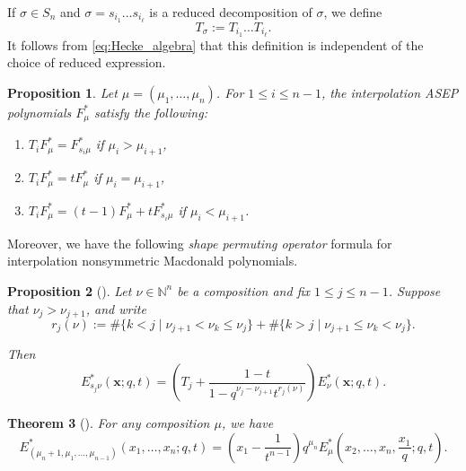 \documentclass[12pt]{amsart}
\newtheorem{thm}{Theorem}[section]
\newtheorem{prop}[thm]{Proposition}
\theoremstyle{definition}
\newcommand{\bfx}{\boldsymbol{x}}
\newcommand{\NN}{\mathbb N}
\def\LW#1{(\textcolor{teal}{LW:#1})}
\def\HBD#1{(\textcolor{violet}{HBD:#1})}
\begin{document}
\begin{appendices}
If $\sigma\in S_n$ and $\sigma=s_{i_1}\dots s_{i_\ell}$ is a reduced decomposition of $\sigma$, we define 
\begin{equation}\label{def:Hecke}
T_\sigma:=T_{i_1}\dots T_{i_\ell}.
\end{equation}
It follows from \eqref{eq:Hecke_algebra} that this definition is independent of the choice of reduced expression. 


\begin{prop}\label{prop:T_i-F_star} \cite[Proposition 2.10]{BenDaliWilliams2025}
    Let $\mu = (\mu_1,\dots,\mu_n)$.  For $1\leq i \leq n-1$, the interpolation ASEP polynomials $F^*_\mu$ satisfy the following: %
    \begin{enumerate}
        \item\label{item 1} $T_i F^*_{\mu}=F^*_{s_i\mu}$ if $\mu_i>\mu_{i+1}$,
        \item\label{item 2} $T_iF^*_{\mu}=tF^*_{\mu}$ if $\mu_i=\mu_{i+1}$,
        \item\label{item 3} $T_i F^*_{\mu}=(t-1)F^*_{\mu}+tF^*_{s_i\mu}$ if $\mu_i<\mu_{i+1}$.
    \end{enumerate}
\end{prop}

Moreover, we have the following \emph{shape permuting
operator} formula for interpolation nonsymmetric Macdonald polynomials.

\begin{prop}[{\cite[Proposition 3.6]{BenDaliWilliams2025}}]
\label{prop:shape}
Let $\nu\in \NN^n$ be a composition and fix $1\leq j \leq n-1$. Suppose that $\nu_j>\nu_{j+1}$, and
write
\begin{equation}\label{eq:def_r}
r_j(\nu):=
\#\{k<j \mid \nu_{j+1}<\nu_{k}\leq \nu_j\}
+
\#\{k>j \mid \nu_{j+1}\leq \nu_k < \nu_j\}.
\end{equation}

Then
    \begin{equation}
\label{shape-permute}
E^*_{s_j \nu}(\bfx;q,t) = 
\left(T_j + \frac{1-t}{1-q^{\nu_{j}-\nu_{j+1}}t^{r_j(\nu)}}\right)
E^*_{\nu}(\bfx;q,t).
\end{equation}
\end{prop}


\begin{thm}[{\cite{Knop1997b,Sahi1996}}]\label{thm:KS_recurrence}
    For any composition $\mu$, we have
 \begin{equation}\label{eq:KS_recurrence}
  E^*_{(\mu_n+1,\mu_1,\dots,\mu_{n-1})}(x_1,\dots,x_n;q,t)=\left(x_1-\frac{1}{t^{n-1}}\right)q^{\mu_n}
  E_\mu^*\left(x_2,\dots,x_n,\frac{x_1}{q};q,t\right).  
    \end{equation}
\end{thm}


\end{appendices}
\end{document}
